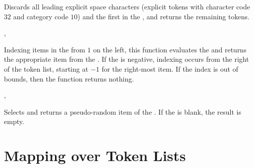 \documentclass[oneside]{book}
\let\tn=\cs
\begin{document}
\begin{function}{\TlVarTail}
\begin{syntax}
 
\end{syntax}
Discards all leading explicit space characters
(explicit tokens with character code $32$ and category code $10$)
and the first  in the , and returns the
remaining tokens.
\end{function}

\begin{function}{\TlItem,\TlVarItem}
\begin{syntax}
  
  
\end{syntax}
Indexing items in the  from $1$ on the left, this
function evaluates the  and returns the
appropriate item from the .
If the  is negative, indexing occurs from
the right of the token list, starting at $-1$ for the right-most item.
If the index is out of bounds, then the function returns nothing.
\end{function}

\begin{function}{\TlRandItem,\TlVarRandItem}
\begin{syntax}
 
 
\end{syntax}
Selects and returns a pseudo-random item of the .
If the  is blank, the result is empty.
\end{function}

\section{Mapping over Token Lists}
\end{document}
